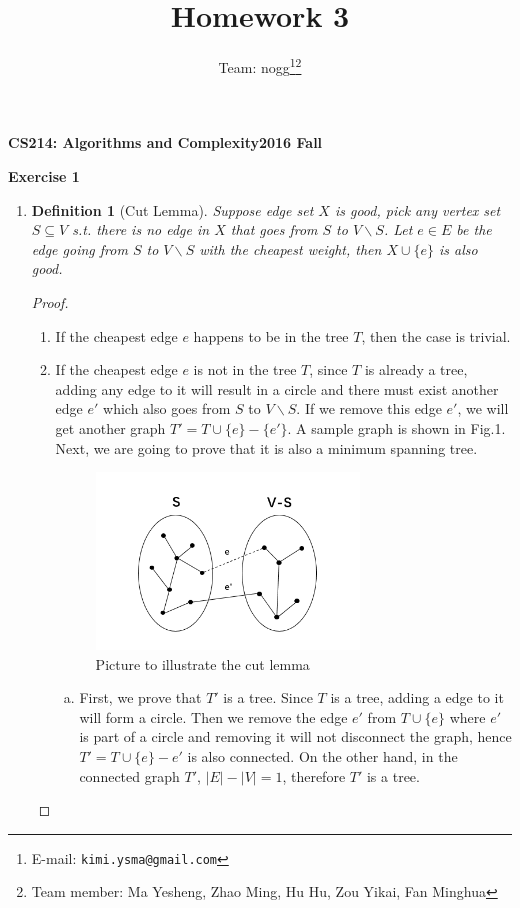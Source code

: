 \documentclass[12pt, notitlepage]{article}
\title{Homework 3}
\author{Team: nogg\footnote{E-mail: \texttt{kimi.ysma@gmail.com}}\footnote{Team member: Ma Yesheng, Zhao Ming, Hu Hu, Zou Yikai, Fan Minghua}}
\newtheorem{defi}{Definition}
\begin{document}
{\bf\small CS214: Algorithms and Complexity}\hfill{\bf\small 2016 Fall}
{\let\newpage\relax\maketitle}


\textbf{Exercise 1}
\begin{enumerate}
\item
\begin{defi}[Cut Lemma]
\vspace{-0.85cm}
Suppose edge set $X$ is good, pick any vertex set $S\subseteq V$ s.t. there is no edge in $X$ that goes from $S$ to $V\backslash S$. Let $e\in E$ be the edge going from $S$ to  $V\backslash S$ with the cheapest weight, then $X\cup \{e\}$ is also good.
\end{defi}
\begin{proof}
	\mbox{ }
\begin{enumerate}[(1)]
	\item If the cheapest edge $e$ happens to be in the tree $T$, then the case is trivial.
	\item If the cheapest edge $e$ is not in the tree $T$, since $T$ is already a tree, adding any edge to it will result in a circle and there must exist another edge $e'$ which also goes from $S$ to  $V\backslash S$. If we remove this edge $e'$, we will get another graph $T' = T\cup \{e\} -\{e'\}$. A sample graph is shown in Fig.1. Next, we are going to prove that it is also a minimum spanning tree.
	\begin{figure}[H]\centering
	\includegraphics[width=7cm]{1.png}
	\caption{Picture to illustrate the cut lemma}
	\end{figure}
	\begin{enumerate}[(a)]
		\item First, we prove that $T'$ is a tree. Since $T$ is a tree, adding a edge to it will form a circle. Then we remove the  edge $e'$ from $T\cup\{e\}$ where $e'$ is part of a circle and removing it will not disconnect the graph, hence $T' = T\cup\{e\} - e'$ is also connected. On the other hand, in the connected graph $T'$, $|E|-|V| = 1$, therefore $T'$ is a tree.

\end{enumerate}
\end{enumerate}
\end{proof}
\end{enumerate}
\end{document}
